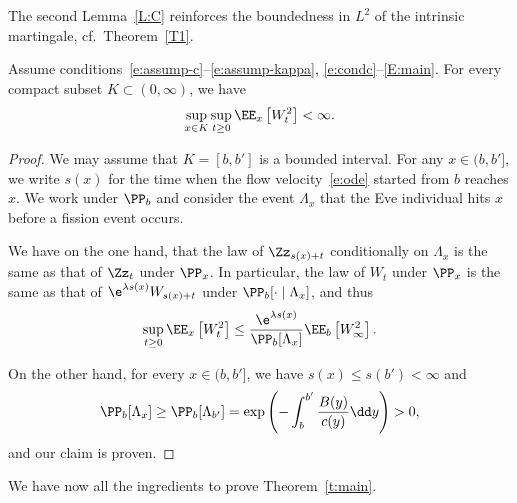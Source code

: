 The second Lemma~\ref{L:C} reinforces the boundedness in $L^2$ of the intrinsic martingale, cf.~Theorem~\ref{T1}.

\begin{lemm}\label{L:C}
Assume conditions~\eqref{e:assump-c}--\eqref{e:assump-kappa}, \eqref{e:condc}--\eqref{E:main}. For every compact subset $K\subset(0,\infty)$, we have
\[
\sup_{x\in K} \sup_{t\geq 0} \EE_x\left[W^2_t \right] < \infty.
\]
\end{lemm}

\begin{proof}
We may assume that $K=[b,b']$ is a bounded interval. For any $x\in(b,b']$, we write $s(x)$ for the time when the flow velocity~\eqref{e:ode} started from $b$ reaches $x$. We work under
$\PP_{b}$ and consider the event $\Lambda_x$ that the Eve individual hits $x$ before a fission event occurs.

We have on the one hand, that the law of $\Zz_{s(x)+t}$ conditionally on $ \Lambda_x$ is the same as that of $\Zz_t$ under $\PP_x$. In particular, the law of $W_t$ under $\PP_x$ is the same as that of $\e^{\lambda s(x)} W_{s(x)+t}$ under $\PP_b[\cdot \mid \Lambda_x]$, and thus
\[
\sup_{t\geq 0} \EE_x\left[W^2_t \right] \leq \frac{\e^{\lambda s(x)}}{\PP_b[\Lambda_x]} \EE_b\left[W^2_{\infty} \right].
\]

On the other hand, for every $x\in(b,b']$, we have $s(x)\leq s(b')<\infty$ and
\[
\PP_b[\Lambda_x]\geq \PP_b[\Lambda_{b'}]=\exp\left(-\int_{b}^{b'} \frac{{B}(y)}{c(y)}\dd y\right)>0,
\]
and our claim is proven.
\end{proof}

We have now all the ingredients to prove Theorem~\ref{t:main}.

